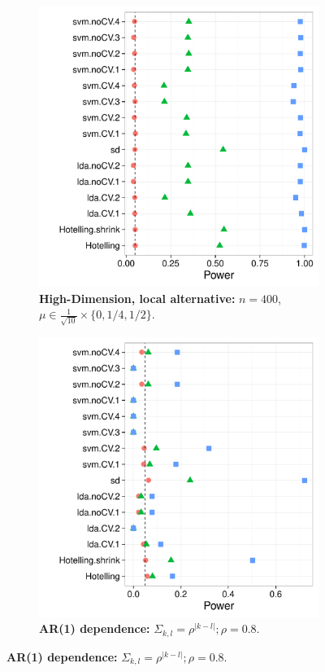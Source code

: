\documentclass[12pt,a4paper]{article}
\theoremstyle{definition}
\newcommand{\set}[1]{\{ #1 \}} %
\newcommand{\mycaption}{Simulation details in Appendix~\ref{apx:simulation_details} except the changes in the sub-captions.}
\begin{document}
\begin{figure}[h]
\centering
\caption{\mycaption}	
	\begin{subfigure}{.4\textwidth}
	  \centering
	  \includegraphics[width=1\linewidth]{"art/2016-08-11 08:32:39"}
	  \caption{\textbf{High-Dimension, local alternative:} $n=400$, $\mu \in \frac{1}{\sqrt{10}} \times \set{0,1/4,1/2}.$} 
	\label{fig:large_sample_3}
	\end{subfigure}
		\begin{subfigure}{.4\textwidth}
		  \centering
		  \includegraphics[width=1\linewidth]{"art/2016-08-07 20:11:46"}
		  \caption{\textbf{AR(1) dependence:} $\Sigma_{k,l}=\rho^{|k-l|}; \rho=0.8$. } 
		\label{fig:ar_1}
	\end{subfigure}
\end{figure}
\end{document}
